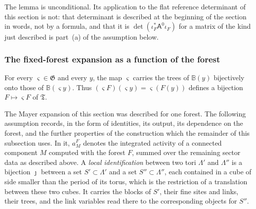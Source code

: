 The lemma is unconditional. Its application to the flat reference
determinant of this section is not: that determinant is described at
the beginning of the section in words, not by a formula, and that it is
$\det(\iota_F^*\mathsf A^0\iota_F)$ for a matrix of the kind just
described is part~(a) of the assumption below.

\subsubsection*{The fixed-forest expansion as a function of the forest}

For every $\varsigma\in\mathfrak G$ and every $y$, the map $\varsigma$
carries the trees of $\mathbb B(y)$ bijectively onto those of
$\mathbb B(\varsigma y)$. Thus
$(\varsigma F)(\varsigma y)=\varsigma(F(y))$ defines a bijection
$F\mapsto\varsigma F$ of $\mathfrak T$.

The Mayer expansion of this section was described for one forest. The
following assumption records, in the form of identities, its output,
its dependence on the forest, and the further properties of the
construction which the remainder of this subsection uses. In it,
$a_M^F$ denotes the integrated activity of a connected component $M$
computed with the forest $F$, summed over the remaining sector data as
described above. A \emph{local identification} between two tori
$\Lambda'$ and $\Lambda''$ is a bijection $\jmath$ between a set
$S'\subset\Lambda'$ and a set $S''\subset\Lambda''$, each contained in a
cube of side smaller than the period of its torus, which is the
restriction of a translation between these two cubes. It carries the
blocks of $S'$, their fine sites and links, their trees, and the link
variables read there to the corresponding objects for $S''$.

